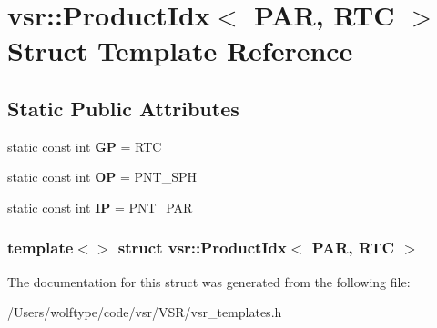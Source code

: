 \hypertarget{structvsr_1_1_product_idx_3_01_p_a_r_00_01_r_t_c_01_4}{\section{vsr\-:\-:Product\-Idx$<$ P\-A\-R, R\-T\-C $>$ Struct Template Reference}
\label{structvsr_1_1_product_idx_3_01_p_a_r_00_01_r_t_c_01_4}
}
\subsection*{Static Public Attributes}
\begin{DoxyCompactItemize}
\item 
\hypertarget{structvsr_1_1_product_idx_3_01_p_a_r_00_01_r_t_c_01_4_af0d78e577a8bbdec4316f8f21507893f}{static const int {\bfseries G\-P} = R\-T\-C}\label{structvsr_1_1_product_idx_3_01_p_a_r_00_01_r_t_c_01_4_af0d78e577a8bbdec4316f8f21507893f}

\item 
\hypertarget{structvsr_1_1_product_idx_3_01_p_a_r_00_01_r_t_c_01_4_ad13661518a208d182c3ec86342103939}{static const int {\bfseries O\-P} = P\-N\-T\-\_\-\-S\-P\-H}\label{structvsr_1_1_product_idx_3_01_p_a_r_00_01_r_t_c_01_4_ad13661518a208d182c3ec86342103939}

\item 
\hypertarget{structvsr_1_1_product_idx_3_01_p_a_r_00_01_r_t_c_01_4_a0a390f729903084849bb98e37d840b77}{static const int {\bfseries I\-P} = P\-N\-T\-\_\-\-P\-A\-R}\label{structvsr_1_1_product_idx_3_01_p_a_r_00_01_r_t_c_01_4_a0a390f729903084849bb98e37d840b77}

\end{DoxyCompactItemize}
\subsubsection*{template$<$$>$ struct vsr\-::\-Product\-Idx$<$ P\-A\-R, R\-T\-C $>$}



The documentation for this struct was generated from the following file\-:\begin{DoxyCompactItemize}
\item 
/\-Users/wolftype/code/vsr/\-V\-S\-R/vsr\-\_\-templates.\-h\end{DoxyCompactItemize}
